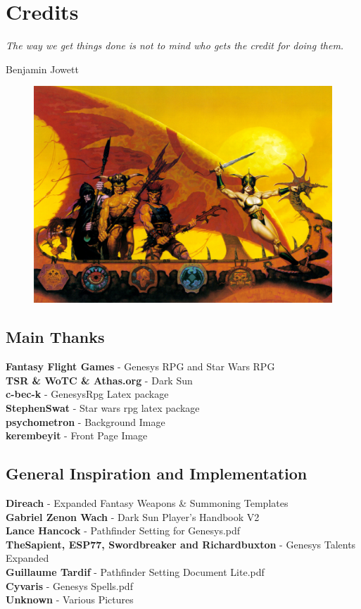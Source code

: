 \chapter{Credits}\label{chap:credits}
\epigraph{\textit{
    The way we get things done is not to mind who gets the credit for doing them.
} }{
    Benjamin Jowett
}

\begin{figure}[H]
\centering
\includegraphics[width=0.4\linewidth]{images/bromdarksun.jpg}
\end{figure}

\section{Main Thanks}
\begin{centering}
\textbf{Fantasy Flight Games} - Genesys RPG and Star Wars RPG\\
\textbf{TSR \& WoTC \& Athas.org} - Dark Sun\\
\textbf{c-bec-k} - GenesysRpg Latex package\\
\textbf{StephenSwat} - Star wars rpg latex package\\
\textbf{psychometron} - Background Image\\
\textbf{kerembeyit} - Front Page Image\\
\end{centering}

\section{General Inspiration and Implementation}
\begin{centering}
\textbf{Direach} - Expanded Fantasy Weapons \& Summoning Templates\\
\textbf{Gabriel Zenon Wach} - Dark Sun Player's Handbook V2\\
\textbf{Lance Hancock} - Pathfinder Setting for Genesys.pdf\\
\textbf{TheSapient, ESP77, Swordbreaker and Richardbuxton} - Genesys Talents Expanded\\
\textbf{Guillaume Tardif} - Pathfinder Setting Document Lite.pdf\\
\textbf{Cyvaris} - Genesys Spells.pdf\\
\textbf{Unknown} - Various Pictures\\
\end{centering}

